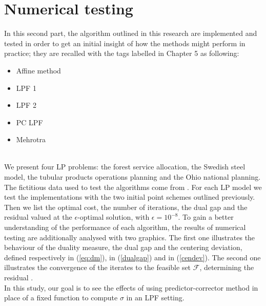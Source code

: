 \documentclass[a4paper,10 pt,titlepage,twoside]{book}
\theoremstyle{plain}
\theoremstyle{definition}
\theoremstyle{remark}
\begin{document}
\chapter{Numerical testing}
In this second part, the algorithm outlined in this research are implemented and tested in order to get an initial insight of how the methods might
perform in practice; they are recalled with the tags labelled in Chapter 5 as following:
\begin{itemize}
	\item Affine method
	\item LPF 1
	\item LPF 2
	\item PC LPF
	\item Mehrotra
\end{itemize}\\ We present four LP problems: the forest service allocation, the Swedish steel model, the tubular products operations planning and the Ohio national planning.\\
The fictitious data used to test the algorithms come from \cite{RR}.
For each LP model we test the implementations with the two initial point schemes outlined previously. Then we list the optimal cost, the number of iterations, the dual gap and the residual valued at the $\epsilon$-optimal solution, with $\epsilon= 10^{-8}$. To gain a better understanding of the performance of each algorithm, the results of numerical testing are additionally analysed with two graphics. The first one illustrates the behaviour of the duality measure, the dual gap and the centering deviation, defined respectively in (\ref{eq:dm}), in (\ref{dualgap}) and in (\ref{cendev}). The second one illustrates the convergence of the iterates to the feasible set $\mathcal{F}$, determining the residual .\\
In this study, our goal is to see the effects of using predictor-corrector method in place of a fixed function to compute $\sigma$ in an LPF setting. 
\end{document}
